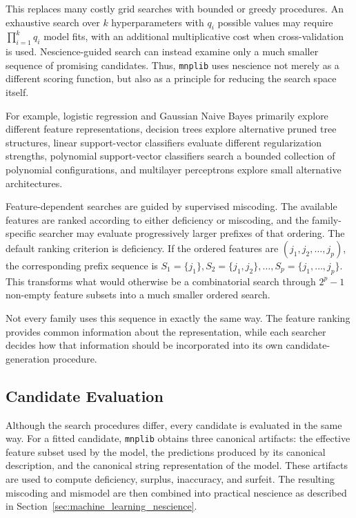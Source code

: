 This replaces many costly grid searches with bounded or greedy procedures. An exhaustive search over $k$ hyperparameters with $q_i$ possible values may require $\prod_{i=1}^{k} q_i$ model fits, with an additional multiplicative cost when cross-validation is used. Nescience-guided search can instead examine only a much smaller sequence of promising candidates. Thus, \texttt{mnplib} uses nescience not merely as a different scoring function, but also as a principle for reducing the search
space itself.

For example, logistic regression and Gaussian Naive Bayes primarily explore different feature representations, decision trees explore alternative pruned tree structures, linear support-vector classifiers evaluate different regularization strengths, polynomial support-vector classifiers search a bounded collection of polynomial configurations, and multilayer perceptrons
explore small alternative architectures.

Feature-dependent searches are guided by supervised miscoding. The available features are ranked according to either deficiency or miscoding, and the family-specific searcher may evaluate progressively larger prefixes of that ordering. The default ranking criterion is deficiency. If the ordered features are $(j_1,j_2,\ldots,j_p)$, the corresponding prefix sequence is $S_1=\{j_1\}, S_2=\{j_1,j_2\}, \ldots,  S_p=\{j_1,\ldots,j_p\}$. This transforms what would otherwise be a combinatorial search through $2^p-1$ non-empty feature subsets into a much smaller ordered search.

Not every family uses this sequence in exactly the same way. The feature ranking provides common information about the representation, while each searcher decides how that information should be incorporated into its own candidate-generation procedure.


\subsection*{Candidate Evaluation}

Although the search procedures differ, every candidate is evaluated in the same way. For a fitted candidate, \texttt{mnplib} obtains three canonical artifacts: the effective feature subset used by the model, the predictions produced by its canonical description, and the canonical string representation of the model. These artifacts are used to compute deficiency, surplus, inaccuracy, and surfeit. The resulting miscoding and mismodel are then combined into practical nescience as described in Section~\ref{sec:machine_learning_nescience}.

